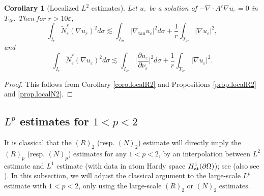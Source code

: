 \documentclass[reqno,12pt]{amsart} %
\newtheorem{corollary}[theorem]{Corollary}
\theoremstyle{definition}
\theoremstyle{remark}
\numberwithin{equation}{section}
\newcommand{\e}{\varepsilon}
\begin{document}
\begin{corollary}[Localized $L^2$ estimates]
    Let $u_\e$ be a solution of $-\nabla \cdot A^\e \nabla u_\e = 0$ in $T_{2r}$. Then for $r> 10\e$,
    \begin{equation}\label{est.localR2}
        \int_{I_r} \widetilde{N}^r_\e(\nabla u_\e)^2 d\sigma \lesssim \int_{I_{2r}}  |\nabla_{\tan} u_\e|^2 d\sigma + \frac{1}{r}\int_{T_{2r}} |\nabla u_\e|^2,
    \end{equation}
    and
    \begin{equation}\label{est.localN2}
        \int_{I_r} \widetilde{N}^r_\e(\nabla u_\e)^2 d\sigma \lesssim \int_{I_{2r}}  \Big|\frac{\partial u_\e}{\partial \nu_\e}\Big|^2 d\sigma + \frac{1}{r}\int_{T_{2r}} |\nabla u_\e|^2.
    \end{equation}
\end{corollary}
\begin{proof}
    This follows from Corollary \ref{coro.localR2} and Propositions \ref{prop.localR2} and \ref{prop.localN2}.
\end{proof}

\subsection{$L^p$ estimates for $1<p<2$}
It is classical that the $(R)_2$ (resp. $(N)_2$) estimate will directly imply the $(R)_p$ (resp. $(N)_p$) estimates for any $1<p<2$, by an interpolation between $L^2$ estimate and $L^1$ estimate (with data in atom Hardy space $H^1_{\rm at}(\partial \Omega)$); see \cite[Theorem 5.2, 6.2]{KP93} (also see \cite{DK87,KS11}).
In this subsection, we will adjust the classical argument to the large-scale $L^p$ estimate with $1<p<2$, only using the large-scale $(R)_2$ or $(N)_2$ estimates.
\end{document}
